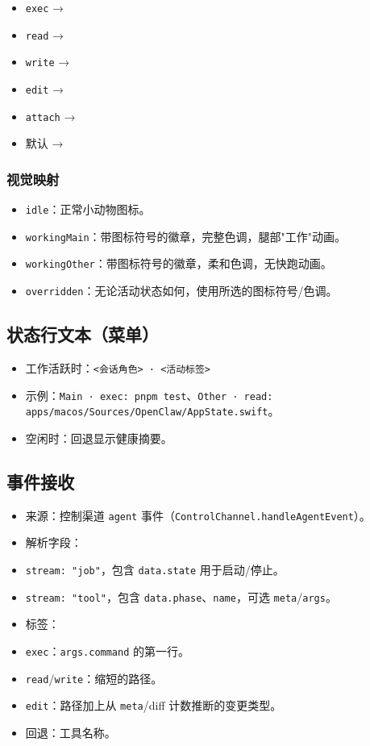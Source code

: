 \begin{itemize}
  \item \texttt{exec} → 
  \item \texttt{read} → 
  \item \texttt{write} → 
  \item \texttt{edit} → 
  \item \texttt{attach} → 
  \item 默认 → 
\end{itemize}


\subsubsection{视觉映射}


\begin{itemize}
  \item \texttt{idle}：正常小动物图标。
  \item \texttt{workingMain}：带图标符号的徽章，完整色调，腿部"工作"动画。
  \item \texttt{workingOther}：带图标符号的徽章，柔和色调，无快跑动画。
  \item \texttt{overridden}：无论活动状态如何，使用所选的图标符号/色调。
\end{itemize}


\subsection{状态行文本（菜单）}


\begin{itemize}
  \item 工作活跃时：\texttt{<会话角色> · <活动标签>}
  \item 示例：\texttt{Main · exec: pnpm test}、\texttt{Other · read: apps/macos/Sources/OpenClaw/AppState.swift}。
  \item 空闲时：回退显示健康摘要。
\end{itemize}


\subsection{事件接收}


\begin{itemize}
  \item 来源：控制渠道 \texttt{agent} 事件（\texttt{ControlChannel.handleAgentEvent}）。
  \item 解析字段：
  \item \texttt{stream: "job"}，包含 \texttt{data.state} 用于启动/停止。
  \item \texttt{stream: "tool"}，包含 \texttt{data.phase}、\texttt{name}，可选 \texttt{meta}/\texttt{args}。
  \item 标签：
  \item \texttt{exec}：\texttt{args.command} 的第一行。
  \item \texttt{read}/\texttt{write}：缩短的路径。
  \item \texttt{edit}：路径加上从 \texttt{meta}/diff 计数推断的变更类型。
  \item 回退：工具名称。
\end{itemize}


